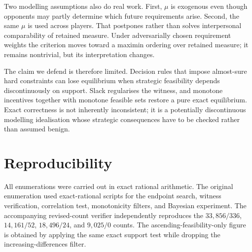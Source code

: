 \documentclass[11pt]{article}
\theoremstyle{definition}
\begin{document}
Two modelling assumptions also do real work. First, $\mu$ is exogenous even though opponents may partly determine which future requirements arise. Second, the same $\mu$ is used across players. That postpones rather than solves interpersonal comparability of retained measure. Under adversarially chosen requirement weights the criterion moves toward a maximin ordering over retained measure; it remains nontrivial, but its interpretation changes.

The claim we defend is therefore limited. Decision rules that impose almost-sure hard constraints can lose equilibrium when strategic feasibility depends discontinuously on support. Slack regularises the witness, and monotone incentives together with monotone feasible sets restore a pure exact equilibrium. Exact correctness is not inherently inconsistent; it is a potentially discontinuous modelling idealisation whose strategic consequences have to be checked rather than assumed benign.

\section*{Reproducibility}
All enumerations were carried out in exact rational arithmetic. The original enumeration used exact-rational scripts for the endpoint search, witness verification, correlation test, monotonicity filters, and Bayesian experiment. The accompanying revised-count verifier independently reproduces the $33{,}856/336$, $14{,}161/52$, $18{,}496/24$, and $9{,}025/0$ counts. The ascending-feasibility-only figure is obtained by applying the same exact support test while dropping the increasing-differences filter.
\end{document}
